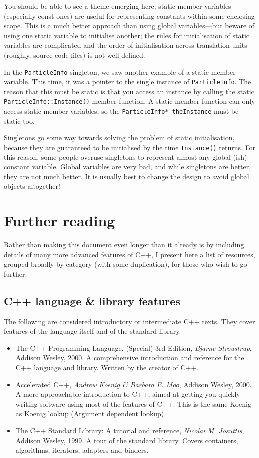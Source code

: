 \documentclass[a4paper]{scrartcl}
\begin{document}
You should be able to see a theme emerging here; static member variables (especially const ones) are useful for representing constants within some enclosing scope. This is a much better approach than using global variables---but beware of using one static variable to initialise another; the rules for initialisation of static variables are complicated and the order of initialisation across translation units (roughly, source code files) is not well defined.

In the \verb|ParticleInfo| singleton, we saw another example of a static member variable. This time, it was a pointer to the single instance of \verb|ParticleInfo|. The reason that this must be static is that you access an instance by calling the static \verb|ParticleInfo::Instance()| member function. A static member function can only access static member variables, so the \verb|ParticleInfo* theInstance| must be static too.

Singletons go some way towards solving the problem of static initialisation, because they are guaranteed to be initialised by the time \verb|Instance()| returns. For this reason, some people overuse singletons to represent almost any global (ish) constant variable. Global variables are very bad, and while singletons are better, they are not much better. It is usually best to change the design to avoid global objects altogether!

\section{Further reading}
Rather than making this document even longer than it already is by including details of many more advanced features of C++, I present here a list of resources, grouped broadly by category (with some duplication), for those who wish to go further.

\subsection{C++ language \& library features}
The following are considered introductory or intermediate C++ texts. They cover features of the language itself and of the standard library.

\begin{itemize}
	\item The C++ Programming Language, (Special) 3rd Edition, \emph{Bjarne Stroustrup}, Addison Wesley, 2000. A comprehensive introduction and reference for the C++ language and library. Written by the creator of C++.
	\item Accelerated C++, \emph{Andrew Koenig \& Barbara E. Moo}, Addison Wesley, 2000. A more approachable introduction to C++, aimed at getting you quickly writing software using most of the features of C++. This is the same Koenig as Koenig lookup (Argument dependent lookup).
	\item The C++ Standard Library: A tutorial and reference, \emph{Nicolai M. Josuttis}, Addison Wesley, 1999. A tour of the standard library. Covers containers, algorithms, iterators, adapters and binders.
\end{itemize}
\end{document}
